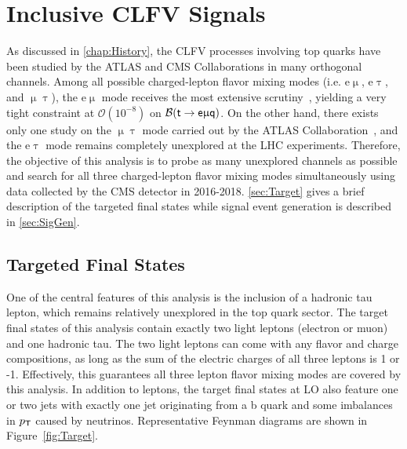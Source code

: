 \chapter{Inclusive CLFV Signals}
\label{chap:Signal}

As discussed in \autoref{chap:History}, the \ac{CLFV} processes involving top quarks have been studied by the \ac{ATLAS} and \ac{CMS} Collaborations in many orthogonal channels. Among all possible charged-lepton flavor mixing modes (i.e. e$\upmu$, e$\uptau$, and $\upmu\uptau$), the e$\upmu$ mode receives the most extensive scrutiny~\cite{ATLAS-CONF-2018-044,CMS:2022ztx,CMS:2023phe}, yielding a very tight constraint at $\mathcal{O}(10^{-8})$ on $\mathcal{B}(\textsf{t}\rightarrow\textsf{e}\upmu\textsf{q})$. On the other hand, there exists only one study on the $\upmu\uptau$ mode carried out by the \ac{ATLAS} Collaboration~\cite{ATLAS-CONF-2023-001}, and the e$\uptau$ mode remains completely unexplored at the \ac{LHC} experiments. Therefore, the objective of this analysis is to probe as many unexplored channels as possible and search for all three charged-lepton flavor mixing modes simultaneously using data collected by the \ac{CMS} detector in 2016-2018. \autoref{sec:Target} gives a brief description of the targeted final states while signal event generation is described in \autoref{sec:SigGen}.
\section{Targeted Final States}
\label{sec:Target}

One of the central features of this analysis is the inclusion of a hadronic tau lepton, which remains relatively unexplored in the top quark sector. The target final states of this analysis contain exactly two light leptons (electron or muon) and one hadronic tau. The two light leptons can come with any flavor and charge compositions, as long as the sum of the electric charges of all three leptons is 1 or -1. Effectively, this guarantees all three lepton flavor mixing modes are covered by this analysis. In addition to leptons, the target final states at \ac{LO} also feature one or two jets with exactly one jet originating from a b quark and some imbalances in $p_{\textsf{T}}$ caused by neutrinos. Representative Feynman diagrams are shown in Figure~\ref{fig:Target}.

